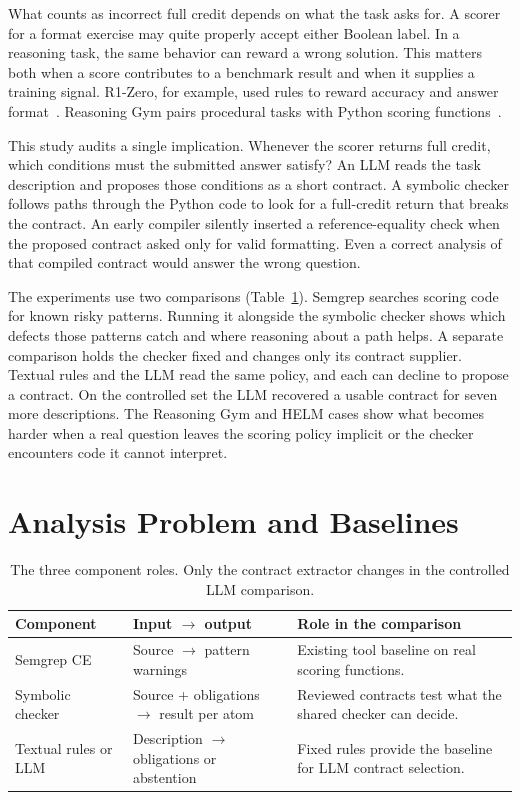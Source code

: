 \documentclass[sigconf]{acmart}
\begin{document}
What counts as incorrect full credit depends on what the task asks for. A scorer for a format exercise may quite properly accept either Boolean label. In a reasoning task, the same behavior can reward a wrong solution. This matters both when a score contributes to a benchmark result and when it supplies a training signal. R1-Zero, for example, used rules to reward accuracy and answer format~\cite{deepseekr1}. Reasoning Gym pairs procedural tasks with Python scoring functions~\cite{reasoninggym}.

This study audits a single implication. Whenever the scorer returns full credit, which conditions must the submitted answer satisfy? An LLM reads the task description and proposes those conditions as a short contract. A symbolic checker follows paths through the Python code to look for a full-credit return that breaks the contract. An early compiler silently inserted a reference-equality check when the proposed contract asked only for valid formatting. Even a correct analysis of that compiled contract would answer the wrong question.

The experiments use two comparisons (Table~\ref{tab:roles}). Semgrep searches scoring code for known risky patterns. Running it alongside the symbolic checker shows which defects those patterns catch and where reasoning about a path helps. A separate comparison holds the checker fixed and changes only its contract supplier. Textual rules and the LLM read the same policy, and each can decline to propose a contract. On the controlled set the LLM recovered a usable contract for seven more descriptions. The Reasoning Gym and HELM cases show what becomes harder when a real question leaves the scoring policy implicit or the checker encounters code it cannot interpret.

\section{Analysis Problem and Baselines}

\begin{table}[t]
\caption{The three component roles. Only the contract extractor changes in the controlled LLM comparison.}
\label{tab:roles}
\centering\small
\begin{tabular}{@{}p{}p{}p{}@{}}
\toprule
Component & Input $\rightarrow$ output & Role in the comparison\\
\midrule
Semgrep CE & Source $\rightarrow$ pattern warnings & Existing tool baseline on real scoring functions.\\
Symbolic checker & Source + obligations $\rightarrow$ result per atom & Reviewed contracts test what the shared checker can decide.\\
Textual rules or LLM & Description $\rightarrow$ obligations or abstention & Fixed rules provide the baseline for LLM contract selection.\\
\bottomrule
\end{tabular}
\end{table}
\end{document}
